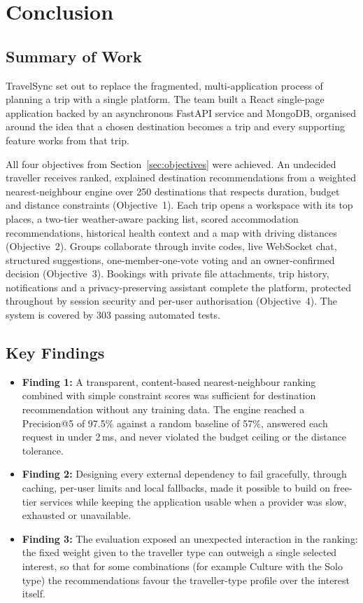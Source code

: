 
\chapter{Conclusion}

\section{Summary of Work}

TravelSync set out to replace the fragmented, multi-application process of
planning a trip with a single platform. The team built a React single-page
application backed by an asynchronous FastAPI service and MongoDB, organised
around the idea that a chosen destination becomes a trip and every
supporting feature works from that trip.

All four objectives from Section~\ref{sec:objectives} were achieved. An undecided traveller
receives ranked, explained destination recommendations from a weighted
nearest-neighbour engine over 250 destinations that respects duration,
budget and distance constraints (Objective~1). Each trip opens a workspace
with its top places, a two-tier weather-aware packing list, scored
accommodation recommendations, historical health context and a map with
driving distances (Objective~2). Groups collaborate through invite codes,
live WebSocket chat, structured suggestions, one-member-one-vote voting and
an owner-confirmed decision (Objective~3). Bookings with private file
attachments, trip history, notifications and a privacy-preserving assistant
complete the platform, protected throughout by session security and per-user
authorisation (Objective~4). The system is covered by 303 passing automated
tests.

\section{Key Findings}

\begin{itemize}
  \item \textbf{Finding 1:} A transparent, content-based nearest-neighbour
    ranking combined with simple constraint scores was sufficient for
    destination recommendation without any training data. The engine
    reached a Precision@5 of 97.5\% against a random baseline of 57\%,
    answered each request in under 2\,ms, and never violated the budget
    ceiling or the distance tolerance.
  \item \textbf{Finding 2:} Designing every external dependency to fail
    gracefully, through caching, per-user limits and local fallbacks, made
    it possible to build on free-tier services while keeping the application
    usable when a provider was slow, exhausted or unavailable.
  \item \textbf{Finding 3:} The evaluation exposed an unexpected interaction
    in the ranking: the fixed weight given to the traveller type can
    outweigh a single selected interest, so that for some combinations (for
    example Culture with the Solo type) the recommendations favour the
    traveller-type profile over the interest itself.
\end{itemize}

